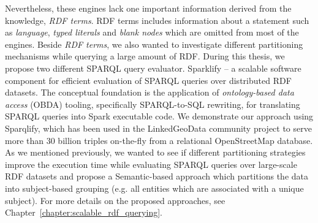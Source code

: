 Nevertheless, these engines lack one important information derived from the knowledge, \emph{\gls{RDF} terms}.
\gls{RDF} terms includes information about a statement such as \emph{language}, \emph{typed literals} and \emph{blank nodes} which are omitted from most of the engines.
Beside \emph{\gls{RDF} terms}, we also wanted to investigate different partitioning mechanisms while querying a large amount of \gls{RDF}.
During this thesis, we propose two different \gls{SPARQL} query evaluator.
Sparklify -- a scalable software component for efficient evaluation of \gls{SPARQL} queries over distributed \gls{RDF} datasets. 
The conceptual foundation is the application of \emph{ontology-based data access} (OBDA) tooling, specifically SPARQL-to-SQL rewriting, for translating \gls{SPARQL} queries into Spark executable code. 
We demonstrate our approach using Sparqlify, which has been used in the LinkedGeoData community project to serve more than 30 billion triples on-the-fly from a relational OpenStreetMap database.
As we mentioned previously, we wanted to see if different partitioning strategies improve the execution time while evaluating \gls{SPARQL} queries over large-scale \gls{RDF} datasets and propose a Semantic-based approach which partitions the data into subject-based grouping (e.g. all entities which are associated with a unique subject).
For more details on the proposed approaches, see Chapter~\ref{chapter:scalable_rdf_querying}.



